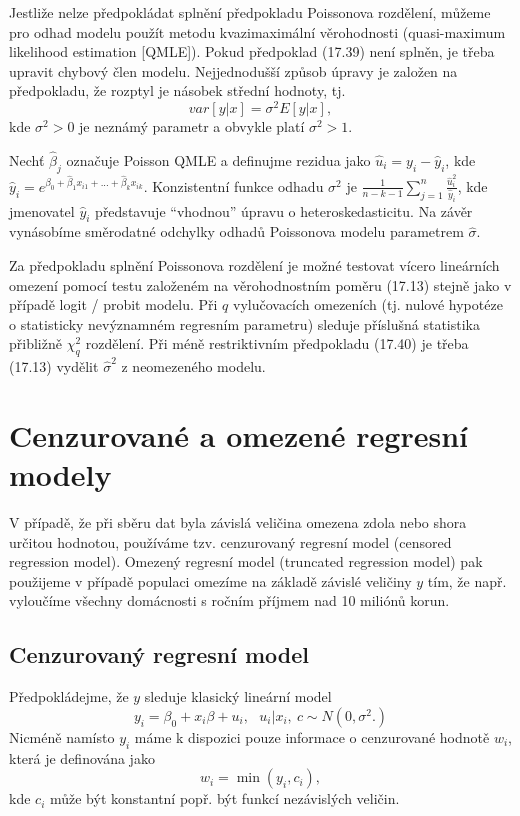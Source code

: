 Jestliže nelze předpokládat splnění předpokladu Poissonova rozdělení, můžeme pro odhad modelu použít metodu kvazimaximální věrohodnosti (quasi-maximum likelihood estimation [QMLE]). Pokud předpoklad (17.39) není splněn, je třeba upravit chybový člen modelu. Nejjednodušší způsob úpravy je založen na předpokladu, že rozptyl je násobek střední hodnoty, tj.
\begin{equation}
var[y|x] = \sigma^2 E[y|x],
\end{equation}
kde $\sigma^2 > 0$ je neznámý parametr a obvykle platí $\sigma^2 > 1$.

Nechť $\hat{\beta}_j$ označuje Poisson QMLE a definujme rezidua jako $\hat{u}_i = y_i - \hat{y}_i$, kde $\hat{y}_i = e^{\hat{\beta}_0 + \hat{\beta}_1 x_{i1} + ... + \hat{\beta}_k x_{ik}}$. Konzistentní funkce odhadu $\sigma^2$ je $\frac{1}{n - k - 1} \sum_{j = 1}^n \frac{\hat{u}^2_i}{\hat{y}_i}$, kde jmenovatel $\hat{y}_i$ představuje ``vhodnou'' úpravu o heteroskedasticitu. Na závěr vynásobíme směrodatné odchylky odhadů Poissonova modelu parametrem $\hat{\sigma}$.

Za předpokladu splnění Poissonova rozdělení je možné testovat vícero lineárních omezení pomocí testu založeném na věrohodnostním poměru (17.13) stejně jako v případě logit / probit modelu. Při $q$ vylučovacích omezeních (tj. nulové hypotéze o statisticky nevýznamném regresním parametru) sleduje příslušná statistika přibližně $\chi^2_q$ rozdělení. Při méně restriktivním předpokladu (17.40) je třeba (17.13) vydělit $\hat{\sigma}^2$ z neomezeného modelu.

\section{Cenzurované a omezené regresní modely}

V případě, že při sběru dat byla závislá veličina omezena zdola nebo shora určitou hodnotou, používáme tzv. cenzurovaný regresní model (censored regression model). Omezený regresní model (truncated regression model) pak použijeme v případě populaci omezíme na základě závislé veličiny $y$ tím, že např. vyloučíme všechny domácnosti s ročním příjmem nad 10 miliónů korun.

\subsection{Cenzurovaný regresní model}

Předpokládejme, že $y$ sleduje klasický lineární model
\begin{equation}
y_i = \beta_0 + x_i \beta + u_i, ~~~ u_i|x_i, ~ c \sim N(0, \sigma^2.)
\end{equation}
Nicméně namísto $y_i$ máme k dispozici pouze informace o cenzurované hodnotě $w_i$, která je definována jako
\begin{equation}
w_i = \min(y_i, c_i),
\end{equation}
kde $c_i$ může být konstantní popř. být funkcí nezávislých veličin.

